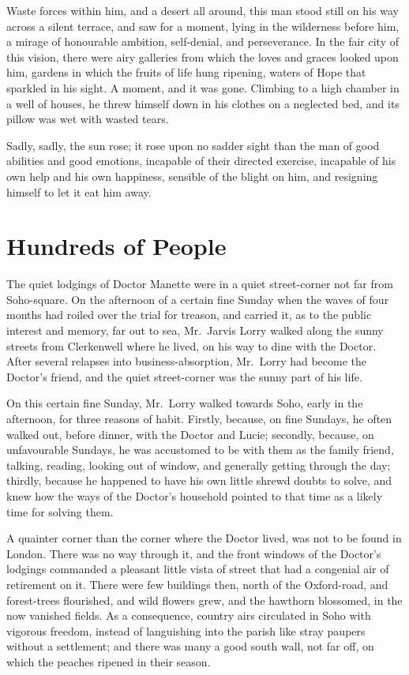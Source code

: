 Waste forces within him, and a desert all around, this man stood
still on his way across a silent terrace, and saw for a moment,
lying in the wilderness before him, a mirage of honourable ambition,
self-denial, and perseverance.  In the fair city of this vision,
there were airy galleries from which the loves and graces looked upon
him, gardens in which the fruits of life hung ripening, waters of Hope
that sparkled in his sight.  A moment, and it was gone.  Climbing to
a high chamber in a well of houses, he threw himself down in his
clothes on a neglected bed, and its pillow was wet with wasted tears.

Sadly, sadly, the sun rose; it rose upon no sadder sight than the man
of good abilities and good emotions, incapable of their directed
exercise, incapable of his own help and his own happiness, sensible
of the blight on him, and resigning himself to let it eat him away.



\chapter{Hundreds of People}


The quiet lodgings of Doctor Manette were in a quiet street-corner
not far from Soho-square.  On the afternoon of a certain fine Sunday
when the waves of four months had roiled over the trial for treason,
and carried it, as to the public interest and memory, far out to sea,
Mr.\ Jarvis Lorry walked along the sunny streets from Clerkenwell
where he lived, on his way to dine with the Doctor.  After several
relapses into business-absorption, Mr.\ Lorry had become the Doctor's
friend, and the quiet street-corner was the sunny part of his life.

On this certain fine Sunday, Mr.\ Lorry walked towards Soho, early in
the afternoon, for three reasons of habit.  Firstly, because, on fine
Sundays, he often walked out, before dinner, with the Doctor and Lucie;
secondly, because, on unfavourable Sundays, he was accustomed to be
with them as the family friend, talking, reading, looking out of window,
and generally getting through the day; thirdly, because he happened
to have his own little shrewd doubts to solve, and knew how the ways
of the Doctor's household pointed to that time as a likely time for
solving them.

A quainter corner than the corner where the Doctor lived, was not to
be found in London.  There was no way through it, and the front windows
of the Doctor's lodgings commanded a pleasant little vista of street
that had a congenial air of retirement on it.  There were few buildings
then, north of the Oxford-road, and forest-trees flourished, and wild
flowers grew, and the hawthorn blossomed, in the now vanished fields.
As a consequence, country airs circulated in Soho with vigorous freedom,
instead of languishing into the parish like stray paupers without a
settlement; and there was many a good south wall, not far off, on which
the peaches ripened in their season.

